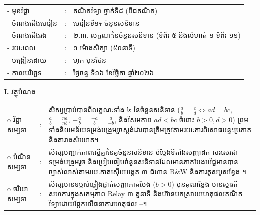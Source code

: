 \documentclass[a4paper,10pt]{article}
\newcommand{\wcirc}{{\CourierBullet\fontsize{9.5pt}{11pt}\selectfont o}}
\newcommand{\en}[1]{{\TimesEn #1}}
\newcommand{\cnum}[1]{{\TimesEn\fontsize{10.5pt}{12pt}\selectfont\ding{\numexpr181+#1\relax}}\hspace{0.2em}}
\begin{document}
{\renewcommand{\arraystretch}{1.06}
\hspace*{4.6cm}%
\begin{tabular}{@{}l l l@{}}
  - \hspace{0.35cm} មុខវិជ្ជា & : & គណិតវិទ្យា ថ្នាក់ទី៨ (ពីជគណិត) \\
  - \hspace{0.35cm} ចំណងជើងមេរៀន & : & មេរៀនទី១៖ ចំនួនសនិទាន \\
  - \hspace{0.35cm} ចំណងជើងរង & : & ២.៣. លក្ខណៈនៃចំនួនសនិទាន (ទំព័រ ៥ និងលំហាត់ ១ ទំព័រ ១១) \\
  - \hspace{0.35cm} រយៈពេល & : & ១ ម៉ោងសិក្សា (៥០នាទី) \\
  - \hspace{0.35cm} បង្រៀនដោយ & : & ហុក ប៊ុនថែន \\
  - \hspace{0.35cm} កាលបរិច្ឆេទ & : & ថ្ងៃចន្ទ ទី១៦ ខែវិច្ឆិកា ឆ្នាំ២០២៦ \\
\end{tabular}

\vspace{2pt}

\textbf{I.} {\muol វត្ថុបំណង}\\[2pt]
\hspace*{0.55cm}%
\begin{tabular}{@{}l l L{14.2cm}@{}}
  \wcirc \hspace{0.25cm} វិជ្ជាសម្បទា & : & សិស្សប្រាប់បានពីលក្ខណៈទាំង ៤ នៃចំនួនសនិទាន ($\frac{a}{b}=\frac{c}{d}\Leftrightarrow ad=bc$, $\frac{a}{b}=\frac{na}{nb}$, $-\frac{a}{b}=\frac{-a}{b}=\frac{a}{-b}$, និងវិសមភាព $ad<bc$ ចំពោះ $b>0, d>0$) ព្រមទាំងនិយមន័យទម្រង់បង្រួមរួចស្ដង់ដារបានត្រឹមត្រូវតាមរយៈការពិសោធបន្ទះប្រភាគ និងតារាងសំយោគ។ \\
  \wcirc \hspace{0.25cm} បំណិនសម្បទា & : & សិស្សបញ្ជាក់ភាពស្មើគ្នានៃគូចំនួនសនិទាន បំប្លែងទីតាំងសញ្ញាដក សរសេរជាទម្រង់បង្រួមរួច និងប្រៀបធៀបចំនួនសនិទានដែលមានភាគបែងអវិជ្ជមានបានច្បាស់លាស់តាមរយៈកាតស៊ើបអង្កេត ៣ ជំហាន \en{B\&W} និងការគូសអូសខ្វែង \en{[tracing]}។ \\
  \wcirc \hspace{0.25cm} ចរិយាសម្បទា & : & សិស្សមានទម្លាប់ផ្ទៀងផ្ទាត់សញ្ញាភាគបែង ($b>0$) មុនគុណខ្វែង មានស្មារតីសហការក្នុងសកម្មភាព \en{Relay} ៣ តួនាទី និងហ៊ានបកស្រាយហេតុផលគណិតវិទ្យាដោយផ្អែកលើធនាគារហេតុផល \cnum{1}--\cnum{5}។ \\
\end{tabular}

}
\end{document}
